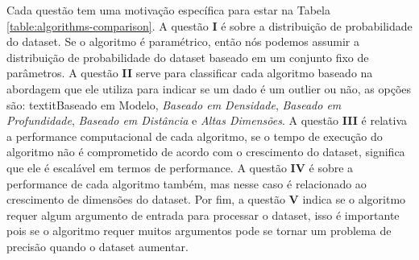 
Cada questão tem uma motivação específica para estar na Tabela \ref{table:algorithms-comparison}. A questão \textbf{I} é sobre a distribuição de probabilidade do dataset. Se o algoritmo é paramétrico, então nós podemos assumir a distribuição de probabilidade do dataset baseado em um conjunto fixo de parâmetros. A questão \textbf{II} serve para classificar cada algoritmo baseado na abordagem que ele utiliza para indicar se um dado é um outlier ou não, as opções são: textit{Baseado em Modelo}, \textit{Baseado em Densidade}, \textit{Baseado em Profundidade}, \textit{Baseado em Distância} e \textit{Altas Dimensões}. A questão \textbf{III} é relativa a performance computacional de cada algoritmo, se o tempo de execução do algoritmo não é comprometido de acordo com o crescimento do dataset, significa que ele é escalável em termos de performance. A questão \textbf{IV} é sobre a performance de cada algoritmo também, mas nesse caso é relacionado ao crescimento de dimensões do dataset. Por fim, a questão \textbf{V} indica se o algoritmo requer algum argumento de entrada para processar o dataset, isso é importante pois se o algoritmo requer muitos argumentos pode se tornar um problema de precisão quando o dataset aumentar.
